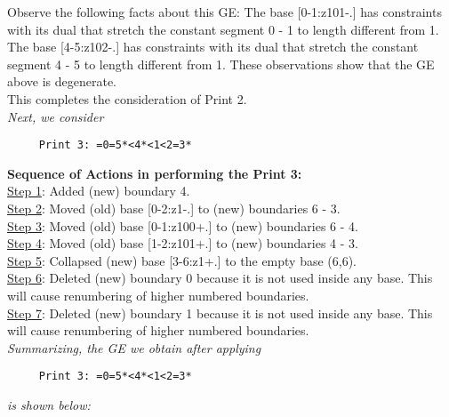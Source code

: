 \documentclass[final]{article}
\begin{document}
Observe the following facts about this GE:
The base [0-1:z101-.]  has constraints with its dual that stretch the constant segment 0 - 1 to length different from 1.  The base [4-5:z102-.]  has constraints with its dual that stretch the constant segment 4 - 5 to length different from 1.  These observations show that the GE above is degenerate.\\[0.1in]
This completes the consideration of Print 2.\\[0.1in]
{\em Next, we consider}
\begin{verbatim}
     Print 3: =0=5*<4*<1<2=3*
\end{verbatim}
{\bf Sequence of Actions in performing the Print 3:}\\
{\underline{Step 1}:} Added (new) boundary 4.\\
{\underline{Step 2}:} Moved (old) base [0-2:z1-.]  to (new) boundaries 6 - 3.\\
{\underline{Step 3}:} Moved (old) base [0-1:z100+.]  to (new) boundaries 6 - 4.\\
{\underline{Step 4}:} Moved (old) base [1-2:z101+.]  to (new) boundaries 4 - 3.\\
{\underline{Step 5}:} Collapsed (new) base [3-6:z1+.]  to the empty base (6,6).
\\
{\underline{Step 6}:} Deleted (new) boundary 0 because it is not used inside any base.  This will cause renumbering of higher numbered boundaries.
\\
{\underline{Step 7}:} Deleted (new) boundary 1 because it is not used inside any base.  This will cause renumbering of higher numbered boundaries.
\\[0.1in]
{\em Summarizing, the GE we obtain after applying}
\begin{verbatim}
     Print 3: =0=5*<4*<1<2=3*
\end{verbatim}
{\em is shown below:}
\end{document}

